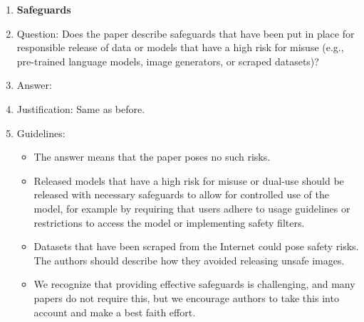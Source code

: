 \documentclass{article}
\numberwithin{theorem}{section}
\theoremstyle{definition}
\begin{document}
\begin{enumerate}
\item {\bf Safeguards}
    \item[] Question: Does the paper describe safeguards that have been put in place for responsible release of data or models that have a high risk for misuse (e.g., pre-trained language models, image generators, or scraped datasets)?
    \item[] Answer: \answerNA{} %
    \item[] Justification: Same as before.
    \item[] Guidelines:
    \begin{itemize}
        \item The answer \answerNA{} means that the paper poses no such risks.
        \item Released models that have a high risk for misuse or dual-use should be released with necessary safeguards to allow for controlled use of the model, for example by requiring that users adhere to usage guidelines or restrictions to access the model or implementing safety filters. 
        \item Datasets that have been scraped from the Internet could pose safety risks. The authors should describe how they avoided releasing unsafe images.
        \item We recognize that providing effective safeguards is challenging, and many papers do not require this, but we encourage authors to take this into account and make a best faith effort.
    \end{itemize}


\end{enumerate}
\end{document}
